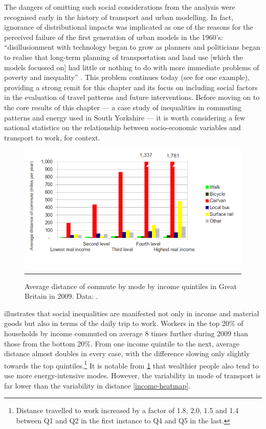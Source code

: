 The dangers of omitting such social considerations from the analysis were
recognised early in the history of transport and urban modelling. In fact,
ignorance of distributional impacts was implicated as
one of the reasons for the perceived failure of the first generation of urban
models in the 1960's: ``disillusionment with technology began to grow as
planners and politicians began to realise that long-term planning of
transportation and land use [which the models focussed on] had little or nothing
to do with more immediate problems of poverty and inequality''
\citep[p~10]{batty1976urban}. This problem continues today (see
\citealp{Tribby2012} for one example), providing a strong remit for this
chapter and its focus on including social factors in the evaluation of travel
patterns and future interventions. Before moving on to the core results of this
chapter --- a case study of inequalities in commuting patterns and energy used
in South Yorkshire --- it is worth considering a few national statistics on
the relationship between socio-economic variables and transport to work, for
context.

\begin{figure}[htbp]
  \centerline{
    \includegraphics[width = 14 cm]{./Figures/Income-dis-GB}}
    \rule{35em}{0.5pt}
  \caption[Trip distance and mode by household income]{Average
distance of commute by mode by income quintiles in Great Britain
in 2009. Data: \citep[Table 6]{DfT2011-commuting}.}
  \label{fig:income-dis}
\end{figure}

 illustrates that social inequalities are manifested
not only in income and material goods but also in terms of the
daily trip to work. Workers in the top 20\% of households by income
commuted on average 8 times further during 2009 than those from the
bottom 20\%. From one income quintile to the next, average distance
almost doubles in every case, with the difference slowing only slightly towards
the
top quintiles.\footnote{Distance
travelled to work increased by a
factor of 1.8, 2.0, 1.5 and 1.4 between Q1 and Q2 in the
first instance to Q4 and Q5 in the last.
}
It is notable from \cref{fig:income-dis} that wealthier people
also tend to use more energy-intensive modes. However,
the variability in mode of transport is far lower than the
variability in distance \cref{income-heatmap}.

